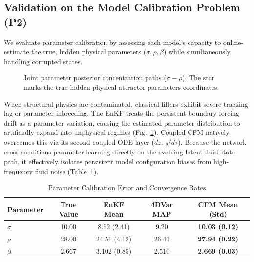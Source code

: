\documentclass[10pt]{article}
\begin{document}
\subsection{Validation on the Model Calibration Problem (P2)}
We evaluate parameter calibration by assessing each model's capacity to online-estimate the true, hidden physical parameters ($\sigma, \rho, \beta$) while simultaneously handling corrupted states.

\begin{figure}[!ht]
\centering
{}
\caption{Joint parameter posterior concentration paths ($\sigma-\rho$). The star marks the true hidden physical attractor parameters coordinates.}
\label{fig:parameter}
\end{figure}

When structural physics are contaminated, classical filters exhibit severe tracking lag or parameter inbreeding. The EnKF treats the persistent boundary forcing drift as a parameter variation, causing the estimated parameter distribution to artificially expand into unphysical regimes (Fig.~\ref{fig:parameter}). Coupled CFM natively overcomes this via its second coupled ODE layer ($dz_{\tau,\theta}/d\tau$). Because the network cross-conditions parameter learning directly on the evolving latent fluid state path, it effectively isolates persistent model configuration biases from high-frequency fluid noise (Table~\ref{tab:calibration}).

\begin{table}[!ht]
\centering
\caption{Parameter Calibration Error and Convergence Rates}
\label{tab:calibration}
\vspace{2mm}
\begin{tabular}{lcccc}
\toprule
Parameter & True Value & EnKF Mean & 4DVar MAP & \textbf{CFM Mean (Std)} \\
\midrule
$\sigma$ & 10.00 & 8.52 (2.41) & 9.20 & \textbf{10.03 (0.12)} \\
$\rho$ & 28.00 & 24.51 (4.12) & 26.41 & \textbf{27.94 (0.22)} \\
$\beta$ & 2.667 & 3.102 (0.85) & 2.510 & \textbf{2.669 (0.03)} \\
\bottomrule
\end{tabular}
\end{table}
\end{document}

